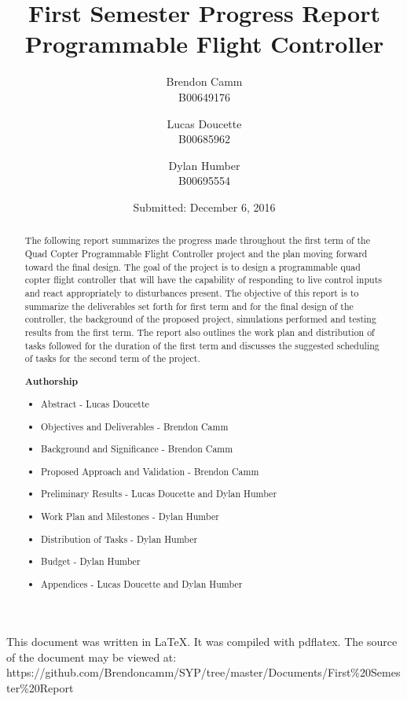 \documentclass[12pt, twoside, letterpaper,titlepage]{article}
\title{First Semester Progress Report \\ Programmable Flight Controller}
\author{Brendon Camm \\ B00649176 \and Lucas Doucette \\ B00685962 \and Dylan Humber \\ B00695554}
\date{Submitted: December 6, 2016}
\begin{document}
	\maketitle
	\newpage
	\vspace*{2in}
	This document was written in \LaTeX.  It was compiled with pdflatex.  The source of the document may be viewed at: \newline\small	https://github.com/Brendoncamm/SYP/tree/master/Documents/First\%20Semester\%20Report
	\vspace*{4in}
	\pagebreak

	\newpage
	\begin{abstract} %
	The following report summarizes the progress made throughout the first term of the Quad Copter Programmable Flight Controller project and the plan moving forward toward the final design. The goal of the project is to design a programmable quad copter flight controller that will have the capability of responding to live control inputs and react appropriately to disturbances present. The objective of this report is to summarize the deliverables set forth for first term and for the final design of the controller, the background of the proposed project, simulations performed and testing results from the first term. The report also outlines the work plan and distribution of tasks followed for the duration of the first term and discusses the suggested scheduling of tasks for the second term of the project. 
	
	\textbf{Authorship}
	\begin{itemize}
		\itemsep-.5em
		\item{Abstract - Lucas Doucette}
		\item{Objectives and Deliverables - Brendon Camm}
		\item{Background and Significance - Brendon Camm}
		\item{Proposed Approach and Validation - Brendon Camm}
		\item{Preliminary Results - Lucas Doucette and Dylan Humber}
		\item{Work Plan and Milestones - Dylan Humber}
		\item{Distribution of Tasks - Dylan Humber}
		\item{Budget - Dylan Humber}
		\item{Appendices - Lucas Doucette and Dylan Humber}
	\end{itemize}
	
	\end{abstract}
	\setcounter{tocdepth}{2}
	\tableofcontents
	\pagebreak
	
\end{document}
